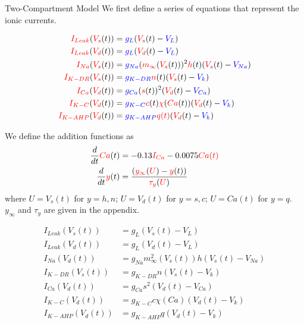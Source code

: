 \begin{frame}{Two-Compartment Model}
    We first define a series of equations that represent the ionic currents.
    {
    \begin{align*}
         \textcolor{red}{I_{Leak}}(\textcolor{red}{V_s}(t)) &= \textcolor{blue}{g_L}(\textcolor{red}{V_s}(t)-\textcolor{blue}{V_L})\\
         \textcolor{red}{I_{Leak}}(\textcolor{red}{V_d}(t)) &= \textcolor{blue}{g_L}(\textcolor{red}{V_d}(t)-\textcolor{blue}{V_L})\\
         \textcolor{red}{I_{Na}}(\textcolor{red}{V_s}(t)) &= \textcolor{blue}{g_{Na}}(\textcolor{red}{m_\infty}(\textcolor{red}{V_s}(t)))^2\textcolor{red}{h}(t)(\textcolor{red}{V_s}(t)-\textcolor{blue}{V_{Na}})\\
         \textcolor{red}{I_{K-DR}}(\textcolor{red}{V_s}(t)) &= \textcolor{blue}{g_{K-DR}}\textcolor{red}{n}(t)(\textcolor{red}{V_s}(t)-\textcolor{blue}{V_k})\\
         \textcolor{red}{I_{Ca}}(\textcolor{red}{V_d}(t)) &= \textcolor{blue}{g_{Ca}}(\textcolor{red}{s}(t))^2(\textcolor{red}{V_d}(t)-\textcolor{blue}{V_{Ca}})\\
         \textcolor{red}{I_{K-C}}(\textcolor{red}{V_d}(t)) &= \textcolor{blue}{g_{K-C}}\textcolor{red}{c}(t)\textcolor{red}{\chi}(\textcolor{red}{Ca}(t))(\textcolor{red}{V_d}(t)-\textcolor{blue}{V_k})\\
         \textcolor{red}{I_{K-AHP}}(\textcolor{red}{V_d}(t)) &= \textcolor{blue}{g_{K-AHP}}\textcolor{red}{q(t)}(\textcolor{red}{V_d}(t)-\textcolor{blue}{V_k})
     \end{align*}
     
    We define the addition functions as
    \begin{align*}
        \frac{d}{dt}\textcolor{red}{Ca}(t) &= -0.13\textcolor{red}{I_{Ca}}-0.0075\textcolor{red}{Ca(t)}\\
        \frac{d}{dt}\textcolor{red}{y}(t) &= \frac{(\textcolor{red}{y_\infty}(\textcolor{red}{U})-\textcolor{red}{y}(t))}{\textcolor{red}{\tau_y}(\textcolor{red}{U})}
    \end{align*}
    where $U=V_s(t)$ for $y=h,n$; $U=V_d(t)$ for $y=s,c$; $U=Ca(t)$ for $y=q$. $y_\infty$ and $\tau_y$ are given in the appendix.
    }
    {
    \begin{align*}
         I_{Leak}(V_s(t)) &= g_L(V_s(t)-V_L)\\
         I_{Leak}(V_d(t)) &= g_L(V_d(t)-V_L)\\
         I_{Na}(V_d(t)) &= g_{Na}m_\infty^2(V_s(t))h(V_s(t)-V_{Na})\\
         I_{K-DR}(V_s(t)) &= g_{K-DR}n(V_s(t)-V_k)\\
         I_{Ca}(V_d(t)) &= g_{Ca}s^2(V_d(t)-V_{Ca})\\
         I_{K-C}(V_d(t)) &= g_{K-C}c\chi(Ca)(V_d(t)-V_k)\\
         I_{K-AHP}(V_d(t)) &= g_{K-AHP}q(V_d(t)-V_k)
    \end{align*}
    
}
\end{frame}
